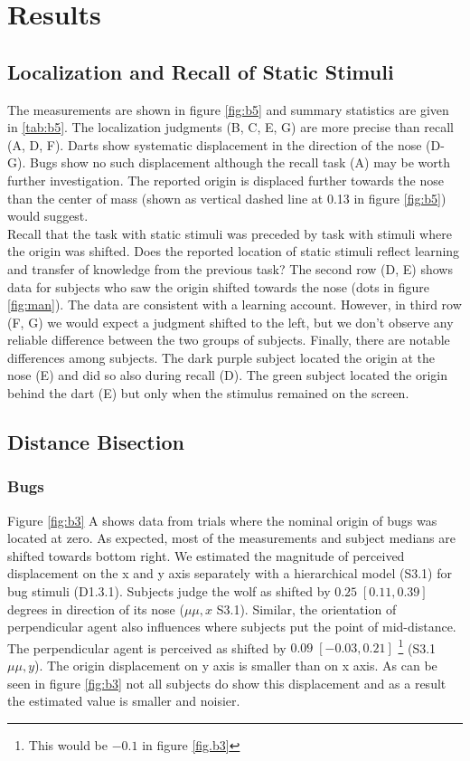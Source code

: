 \documentclass[10pt]{article}
\begin{document}
\section*{Results}

\subsection*{Localization and Recall of Static Stimuli}

The measurements are shown in figure \ref{fig:b5} and summary statistics are given in \ref{tab:b5}. 
The localization judgments (B, C, E, G) are more precise than recall (A, D, F). 
Darts show systematic displacement in the direction of the nose (D-G). 
Bugs show no such displacement although the recall task (A) may be worth further investigation. 
The reported origin is displaced further towards the nose than the center of mass (shown as vertical dashed line at 0.13 in figure \ref{fig:b5}) would suggest. \\
Recall that the task with static stimuli was preceded by task with stimuli where the origin was shifted. 
Does the reported location of static stimuli reflect learning and transfer of knowledge from the previous task? 
The second row (D, E) shows data for subjects who saw the origin shifted towards the nose (dots in figure \ref{fig:man}). 
The data are consistent with a learning account. 
However, in third row (F, G) we would expect a judgment shifted to the left, but we don't observe any reliable difference between the two groups of subjects. 
Finally, there are notable differences among subjects. 
The dark purple subject located the origin at the nose (E) and did so also during recall (D). 
The green subject located the origin behind the dart (E) but only when the stimulus remained on the screen. 

\subsection*{Distance Bisection}
\subsubsection*{Bugs}
Figure \ref{fig:b3} A shows data from trials where the nominal origin of bugs was located at zero. 
As expected, most of the measurements and subject medians are shifted towards bottom right.
We estimated the magnitude of perceived displacement on the x and y axis separately with a hierarchical model (S3.1) for bug stimuli (D1.3.1). Subjects judge the wolf as shifted by $0.25 \; [0.11,0.39]$ degrees in direction of its nose ($\mu{\mu,x}$ S3.1). %
Similar, the orientation of perpendicular agent also influences where subjects put the point of mid-distance. 
The perpendicular agent is perceived as shifted by $0.09\; [-0.03,0.21]$ \footnote{This would be $-0.1$ in figure \ref{fig.b3}} (S3.1 $\mu{\mu,y}$). 
The origin displacement on y axis is smaller than on x axis. 
As can be seen in figure \ref{fig:b3} not all subjects do show this displacement and as a result the estimated value is smaller and noisier.\\
\end{document}
